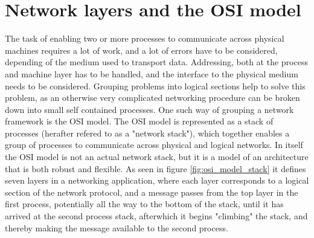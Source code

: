 \section{Network layers and the OSI model}
The task of enabling two or more processes to communicate across physical machines requires a lot of work, and a lot of errors have to be considered, depending of the medium used to transport data. Addressing, both at the process and machine layer has to be handled, and the interface to the physical medium needs to be considered. Grouping problems into logical sections help to solve this problem, as an otherwise very complicated networking procedure can be broken down into small self contained processes.
One such way of grouping a network framework is the OSI model. The OSI model is represented as a stack of processes (herafter refered to as a "network stack"), which together enables a group of processes to communicate across physical and logical networks.
In itself the OSI model is not an actual network stack, but it is a model of an architecture that is both robust and flexible. 
As seen in figure \ref{fig:osi_model_stack} it defines seven layers in a networking application, where each layer corresponds to a logical section of the network protocol, and a message passes from the top layer in the first process, potentially all the way to the bottom of the stack, until it has arrived at the second process stack, afterwhich it begins "climbing" the stack, and thereby making the message available to the second process.
